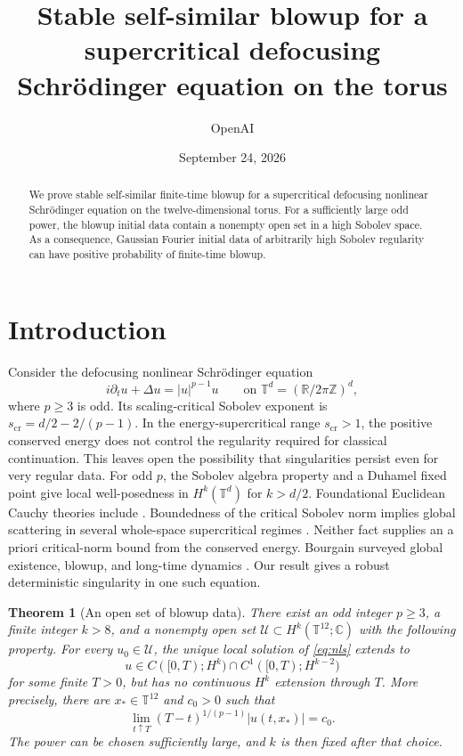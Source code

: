 \documentclass[11pt]{article}
\title{Stable self-similar blowup for a supercritical defocusing Schr\"odinger equation on the torus}
\author{OpenAI}
\date{September 24, 2026}
\numberwithin{equation}{section}
\newtheorem{theorem}{Theorem}[section]
\theoremstyle{definition}
\theoremstyle{remark}
\begin{document}
\maketitle

\begin{abstract}
We prove stable self-similar finite-time blowup for a supercritical
defocusing nonlinear Schr\"odinger equation on the twelve-dimensional
torus. For a sufficiently large odd power, the blowup initial data contain
a nonempty open set in a high Sobolev space. As a consequence, Gaussian
Fourier initial data of arbitrarily high Sobolev regularity can have
positive probability of finite-time blowup.
\end{abstract}

\section{Introduction}
\label{sec:introduction}

Consider the defocusing nonlinear Schr\"odinger equation
\begin{equation}\label{eq:nls}
 i\partial_tu+\Delta u=|u|^{p-1}u
 \qquad\text{on }\mathbb T^d=(\mathbb R/2\pi\mathbb Z)^d,
\end{equation}
where $p\geq3$ is odd. Its scaling-critical Sobolev exponent is
$s_{\mathrm{cr}}=d/2-2/(p-1)$. In the energy-supercritical range
$s_{\mathrm{cr}}>1$, the positive conserved energy does not control
the regularity required for classical continuation. This leaves open
the possibility that singularities persist even for very regular data.
For odd $p$, the Sobolev algebra property and a Duhamel fixed point give
local well-posedness in $H^k(\mathbb T^d)$ for $k>d/2$.
Foundational Euclidean Cauchy theories include
\cite{GinibreVelo1979,CazenaveWeissler1990}. Boundedness of the critical
Sobolev norm implies global scattering in several whole-space
supercritical regimes \cite{KillipVisan2010}. Neither fact
supplies an a priori critical-norm bound from the conserved energy.
Bourgain surveyed global existence, blowup, and long-time dynamics
\cite{Bourgain2000}. Our result gives a robust deterministic
singularity in one such equation.

\begin{theorem}[An open set of blowup data]\label{thm:blowup}
There exist an odd integer $p\geq3$, a finite integer $k>8$, and a
nonempty open set $\mathcal U\subset H^k(\mathbb T^{12};\mathbb C)$
with the following property. For every $u_0\in\mathcal U$, the unique
local solution of \eqref{eq:nls} extends to
\[
 u\in C([0,T);H^k)\cap C^1([0,T);H^{k-2})
\]
for some finite $T>0$, but has no continuous $H^k$ extension through $T$.
More precisely, there are $x_*\in\mathbb T^{12}$ and $c_0>0$ such that
\[
 \lim_{t\uparrow T}(T-t)^{1/(p-1)}|u(t,x_*)|=c_0.
\]
The power can be chosen sufficiently large, and $k$ is then fixed after
that choice.
\end{theorem}
\end{document}
